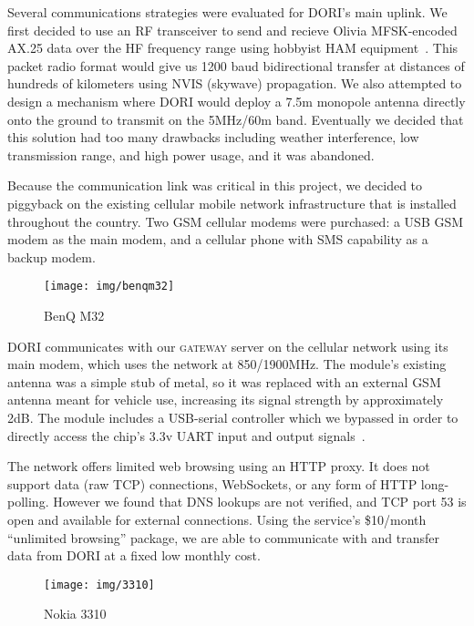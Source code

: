     Several communications strategies were evaluated for DORI's main uplink. We first decided to use an RF transceiver to send and recieve Olivia MFSK-encoded AX.25 data over the HF frequency range using hobbyist HAM equipment~\cite{olivia-mfsk}. This packet radio format would give us 1200 baud bidirectional transfer at distances of hundreds of kilometers using NVIS (skywave) propagation. We also attempted to design a mechanism where DORI would deploy a 7.5m monopole antenna directly onto the ground to transmit on the 5MHz/60m band. Eventually we decided that this solution had too many drawbacks including weather interference, low transmission range, and high power usage, and it was abandoned.

    Because the communication link was critical in this project, we decided to piggyback on the existing cellular mobile network infrastructure that is installed throughout the country. Two GSM cellular modems were purchased: a  USB GSM modem as the main modem, and a  cellular phone with SMS capability as a backup modem.
    
    \begin{wrapfigure}{l}{0.17\textwidth}
        \centering
        \texttt{[image: img/benqm32]}
        \caption*{BenQ M32}
    \end{wrapfigure}

    DORI communicates with our \textsc{gateway} server on the cellular network using its main modem, which uses the  network at 850/1900MHz. The module's existing antenna was a simple stub of metal, so it was replaced with an external GSM antenna meant for vehicle use, increasing its signal strength by approximately 2dB. The module includes a  USB-serial controller which we bypassed in order to directly access the  chip's 3.3v UART input and output signals~\cite{m32}.

    The  network offers limited web browsing using an HTTP proxy. It does not support data (raw TCP) connections, WebSockets, or any form of HTTP long-polling. However we found that DNS lookups are not verified, and TCP port 53 is open and available for external connections. Using the service's \$10/month ``unlimited browsing'' package, we are able to communicate with and transfer data from DORI at a fixed low monthly cost.

    \begin{wrapfigure}{l}{0.17\textwidth}
        \centering
        \texttt{[image: img/3310]}
        \caption*{Nokia 3310}
    \end{wrapfigure}
    
